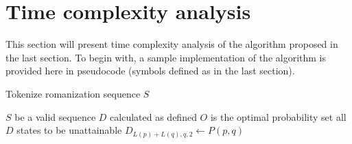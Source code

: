 \documentclass[a4paper,11pt,twocolumn]{article}
\begin{document}
\section{Time complexity analysis}

This section will present time complexity analysis of the algorithm proposed in the last section. To begin with, a sample implementation of the algorithm is provided here in pseudocode (symbols defined as in the last section).

\begin{algorithm}
\caption{Tokenize romanization sequence $S$}

\begin{algorithmic}
\REQUIRE $S$ be a valid sequence
\ENSURE $D$ calculated as defined
\ENSURE $O$ is the optimal probability
\STATE set all $D$ states to be unattainable
        \STATE $D_{L(p)+L(q),q,2} \leftarrow P(p,q)$
      \ENDIF
    \ENDIF
  \ENDFOR
\ENDFOR
{}
    \ENDIF
        \ENDIF
        \ENDIF
        \ENDIF
        \ENDIF
      \ENDFOR
    \ENDFOR
  \ENDFOR
\ENDFOR
\end{algorithmic}

\end{algorithm}

\end{document}
